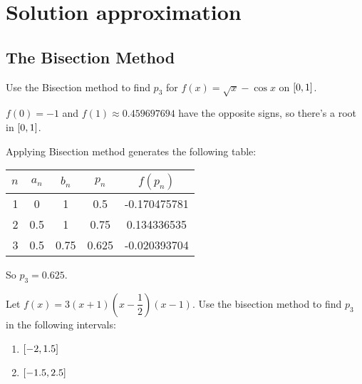 \documentclass[../../Assignments.tex]{subfiles}
\begin{document}
\chapter{Solution approximation}

\section{The Bisection Method}

\begin{exercise}
    Use the Bisection method to find \(p_3\) for \(f(x) = \sqrt{x} - \cos{x}\) on \(\interval{0}{1}\).
\end{exercise}

\begin{solution}
    \(f(0) = -1\) and \(f(1) \approx \num{0.459697694}\) have the opposite
    signs, so there's a root in \(\interval{0}{1}\).

    Applying Bisection method generates the following table:

    \begin{table}[H]    %
        \centering
        \begin{tabular}{r S[table-format=1.1] S[table-format=1.2] S[table-format=1.3] S[table-format=-1.9]}
            \toprule
            \(n\)  &  {\(a_n\)}  &  {\(b_n\)}  &  {\(p_n\)}  &  {\(f(p_n)\)}  \\
              &  0          &  1          &  0.5        &  -0.170475781  \\
                2  &  0.5        &  1          &  0.75       &   0.134336535  \\
                3  &  0.5        &  0.75       &  0.625      &  -0.020393704  \\
            \bottomrule
        \end{tabular}
    \end{table}

    So \(p_3 = \num{0.625}\).
\end{solution}

\begin{exercise}
    Let \(f(x) = 3 (x + 1) (x - \dfrac{1}{2}) (x - 1)\). Use the bisection
    method to find \(p_3\) in the following intervals:

    \begin{multicols}{2}
        \begin{enumerate}[label = (\alph*)]
            \item \(\interval{-2}{\num{1.5}}\)
            \item \(\interval{\num{-1.5}}{\num{2.5}}\)
        \end{enumerate}
    \end{multicols}
\end{exercise}
\end{document}
